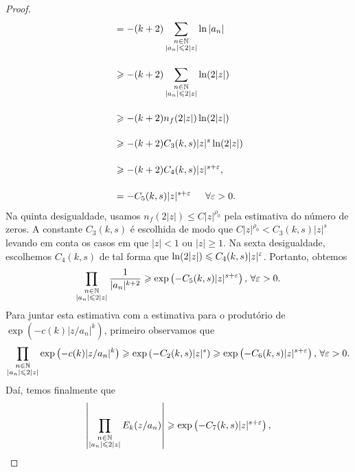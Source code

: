 \begin{proof}
\begin{align*}
            &= 
            -(k+2)\sum_{\substack{n\in\mathbb{N} \\ |a_n| \leqslant 2|z|}} \ln|a_n| \\[0.4cm]
            &\geqslant 
            -(k+2)\sum_{\substack{n\in\mathbb{N} \\ |a_n| \leqslant 2|z|}} \ln(2|z|) \\[0.4cm]
            &\geqslant 
            -(k+2) n_f(2|z|) \ln(2|z|) \\[0.4cm]
            &\geqslant
            -(k+2) C_3(k, s) |z|^s \ln(2|z|) \\[0.4cm]
            &\geqslant
            -(k+2) C_4(k, s) |z|^{s + \varepsilon}, \\[0.4cm]
            &=
            -C_5(k,s) |z|^{s + \varepsilon} \, \ \ \ \ \forall \varepsilon > 0.
        \end{align*}
        Na quinta desigualdade, usamos $n_f(2|z|) \leq C|z|^{\rho_0}$ pela estimativa do número de zeros. A constante $C_3(k,s)$ é escolhida de modo que $C|z|^{\rho_0} < C_3(k,s)|z|^s$ levando em conta os casos em que $|z|< 1$ ou $|z| \geq 1$. Na sexta desigualdade, escolhemos $C_4(k,s)$ de tal forma que $\ln(2|z|) \leqslant C_4(k,s)|z|^\varepsilon$. Portanto, obtemos
        \begin{equation*}
            \prod_{\substack{n\in\mathbb{N} \\ |a_n| \leqslant 2|z|}} \frac{1}{|a_n|^{k+2}}
            \geqslant
            \exp
            \left(
            -C_5(k, s) |z|^{s + \varepsilon}
            \right), \, \forall \varepsilon > 0.
        \end{equation*}
        Para juntar esta estimativa com a estimativa para o produtório de $\exp(-c(k)|z/a_n|^k)$,
        primeiro observamos que
        \begin{align*}
            \prod_{\substack{n\in\mathbb{N} \\ |a_n| \leqslant 2|z|}} \exp\left( -c(k)|z/a_n|^k \right)
            \geqslant
            \exp
            \left( 
            -C_2(k,s)|z|^s
            \right)
            \geqslant
            \exp
            \left( 
            -C_6(k,s)|z|^{s + \varepsilon}
            \right), \, \forall \varepsilon > 0.
        \end{align*}
        Daí, temos finalmente que
        \begin{equation*}
            \left|
            \prod_{\substack{n\in\mathbb{N} \\ |a_n| \leqslant 2|z|}} E_k(z/a_n)
            \right| 
            \geqslant
            \exp
            \left(
            -C_7(k, s) |z|^{s + \varepsilon}
            \right),
        \end{equation*}

\end{proof}
